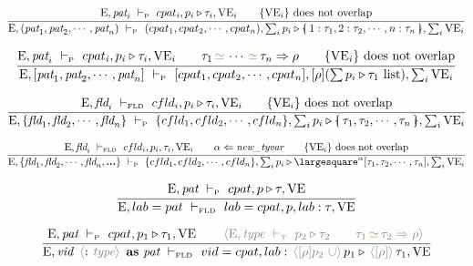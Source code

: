 \documentclass[11pt,a4paper]{article}
\newcommand{\key}[1]{\textrm{\textbf{#1}}}
\newcommand{\prodlhs}[1]{\textit{#1}}
\newcommand{\record}[1]{\{\!\!\shortmid #1 \shortmid\!\!\}}
\newcommand{\irecrd}[2]{\largesquare^{#1}{#2}}
\newcommand{\qualtype}[2]{#1 \triangleright #2}
\newcommand{\unify}[3]{#1\,{\color{brown}{\simeq}}\,#2 \Rightarrow #3}
\newcommand{\unifylist}[3]{#1\,{\color{brown}{\simeq}}\,\cdots\,{\color{brown}{\simeq}}\,#2 \Rightarrow #3}
\newcommand{\braced}[1]{\{#1\}}
\newcommand{\angled}[1]{\,{\color{gray}\langle#1\rangle}\,}
\newcommand{\Env}  {\textrm{E}}
\newcommand{\VE}   {\textrm{VE}}
\newcommand{\vdashP}  {\ \vdash_{\textrm{\tiny P}}\  }
\newcommand{\vdashT}  {\ \vdash_{\textrm{\tiny T}}\  }
\newcommand{\vdashFLD}{\ \vdash_\textrm{\tiny FLD}\  }
\newcommand{\corenew}[1]{\textit{new\_#1}}
\begin{document}
\[
\cfrac
 {\Env,\prodlhs{pat}_i \vdashP cpat_i,\qualtype{p_i}{\tau_i},\VE_i \qquad
  \braced{\VE_i}\ \textrm{does not overlap}}
 {\Env, (\prodlhs{pat}_1,\prodlhs{pat}_2,\cdots,\prodlhs{pat}_n) \vdashP
  (cpat_1,cpat_2,\cdots,cpat_n), \qualtype{\sum_i p_i}{\record{1:\tau_1,2:\tau_2,\cdots,n:\tau_n}}, \sum_i\VE_i}
\]

\[
\cfrac
 {\Env,\prodlhs{pat}_i \vdashP cpat_i,\qualtype{p_i}{\tau_i},\VE_i  \qquad
  \unifylist{\tau_1}{\tau_n}{\rho}                                  \qquad
  \braced{\VE_i}\ \textrm{does not overlap}}
 {\Env, [\prodlhs{pat}_1,\prodlhs{pat}_2,\cdots,\prodlhs{pat}_n] \vdashP
    [cpat_1,cpat_2,\cdots,cpat_n], [\rho](\qualtype{\sum p_i}{\tau_1\ \textrm{list}}), \sum_i\VE_i}
\]

\[
\cfrac
 {\Env,\prodlhs{fld}_i \vdashFLD cfld_i,\qualtype{p_i}{\tau_i},\VE_i \qquad
  \braced{\VE_i}\ \textrm{does not overlap}}
 {\Env, \braced{\prodlhs{fld}_1,\prodlhs{fld}_2,\cdots,\prodlhs{fld}_n} \vdashP
    \braced{cfld_1,cfld_2,\cdots,cfld_n}, \qualtype{\sum_i p_i}{\record{\tau_1,\tau_2,\cdots,\tau_n}}, \sum_i\VE_i}
\]

\[
\cfrac
 {\Env,\prodlhs{fld}_i \vdashFLD cfld_i,p_i,\tau_i,\VE_i \qquad
  \alpha \Leftarrow \corenew{tyvar}                      \qquad
  \braced{\VE_i}\ \textrm{does not overlap}}
 {\Env, \braced{\prodlhs{fld}_1,\prodlhs{fld}_2,\cdots,\prodlhs{fld}_n,\key{...}} \vdashP
    \braced{cfld_1,cfld_2,\cdots,cfld_n}, \qualtype{\sum_i p_i}{\irecrd{\alpha}{[\tau_1,\tau_2,\cdots,\tau_n]}}, \sum_i\VE_i}
\]

\[
\cfrac
 {\Env,\prodlhs{pat} \vdashP cpat, \qualtype{p}{\tau}, \VE}
 {\Env, lab = pat \vdashFLD lab=cpat, p, lab:\tau, \VE }
\]

\[
\cfrac
 {\Env,\prodlhs{pat}  \vdashP cpat,\qualtype{p_1}{\tau_1}, \VE      \qquad
  \angled{\Env,\prodlhs{type} \vdashT \qualtype{p_2}{\tau_2}        \qquad
  \unify{\tau_1}{\tau_2}{\rho}}}
 {\Env, \prodlhs{vid}\ \angled{\key{:}\ \prodlhs{type}}\ \key{as}\ \prodlhs{pat}  \vdashFLD 
    vid=cpat, lab:\qualtype{\angled{[\rho]p_2\ \cup} p_1}{\angled{[\rho]}\tau_1}, \VE }
\]
\end{document}
